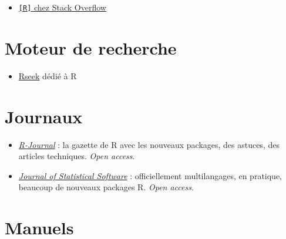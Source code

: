\documentclass[
  letterpaper,
  DIV=11,
  numbers=noendperiod]{scrreprt}
\providecommand{\tightlist}{%
  \setlength{\itemsep}{0pt}\setlength{\parskip}{0pt}}\usepackage{longtable,booktabs,array}
\begin{document}
\begin{itemize}
\tightlist
\item
  \href{http://stackoverflow.com/tags/r/info}{\texttt{{[}R{]}} chez
  Stack Overflow}
\end{itemize}

\hypertarget{moteur-de-recherche}{%
\section{Moteur de recherche}\label{moteur-de-recherche}}

\begin{itemize}
\tightlist
\item
  \href{http://rseek.org/}{Rseek} dédié à R
\end{itemize}

\hypertarget{journaux}{%
\section{Journaux}\label{journaux}}

\begin{itemize}
\tightlist
\item
  \href{http://journal.r-project.org/}{\emph{R-Journal}} : la gazette de
  R avec les nouveaux packages, des astuces, des articles techniques.
  \emph{Open access}.
\item
  \href{http://www.jstatsoft.org/}{\emph{Journal of Statistical
  Software}} : officiellement multilangages, en pratique, beaucoup de
  nouveaux packages R. \emph{Open access}.
\end{itemize}

\hypertarget{manuels}{%
\section{Manuels}\label{manuels}}
\end{document}
